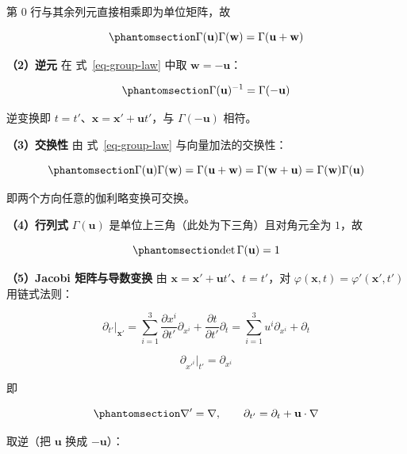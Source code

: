 \documentclass[
  chinese,
  a4paper,
  UTF8,
  12pt,
  oneside,
  openany]{ctexbook}
\theoremstyle{plain}
\theoremstyle{plain}
\theoremstyle{plain}
\theoremstyle{definition}
\theoremstyle{plain}
\theoremstyle{plain}
\theoremstyle{remark}
\begin{document}
第 \(0\) 行与其余列元直接相乘即为单位矩阵，故

\begin{equation}\protect\phantomsection\label{eq-group-law}{
\Gamma(\mathbf{u})\Gamma(\mathbf{w})=\Gamma(\mathbf{u}+\mathbf{w})
}\end{equation}

\textbf{（2）逆元} 在 式~\ref{eq-group-law} 中取
\(\mathbf{w}=-\mathbf{u}\)：

\begin{equation}\protect\phantomsection\label{eq-inverse}{
\Gamma(\mathbf{u})^{-1}=\Gamma(-\mathbf{u})
}\end{equation}

逆变换即 \(t=t'\)、\(\mathbf{x}=\mathbf{x}'+\mathbf{u}t'\)，与
\(\Gamma(-\mathbf{u})\) 相符。

\textbf{（3）交换性} 由 式~\ref{eq-group-law} 与向量加法的交换性：

\begin{equation}\protect\phantomsection\label{eq-boost-commute}{
\Gamma(\mathbf{u})\Gamma(\mathbf{w})=\Gamma(\mathbf{u}+\mathbf{w})=\Gamma(\mathbf{w}+\mathbf{u})=\Gamma(\mathbf{w})\Gamma(\mathbf{u})
}\end{equation}

即两个方向任意的伽利略变换可交换。

\textbf{（4）行列式} \(\Gamma(\mathbf{u})\)
是单位上三角（此处为下三角）且对角元全为 \(1\)，故

\begin{equation}\protect\phantomsection\label{eq-det}{
\det\Gamma(\mathbf{u})=1
}\end{equation}

\textbf{（5）Jacobi 矩阵与导数变换} 由
\(\mathbf{x}=\mathbf{x}'+\mathbf{u}t'\)、\(t=t'\)，对
\(\varphi(\mathbf{x},t)=\varphi'(\mathbf{x}',t')\) 用链式法则：

\[
\partial_{t'}\Big|_{\mathbf{x}'}
=\sum_{i=1}^{3}\frac{\partial x^{i}}{\partial t'}\partial_{x^{i}}+\frac{\partial t}{\partial t'}\partial_{t}
=\sum_{i=1}^{3}u^{i}\partial_{x^{i}}+\partial_{t}
\]

\[
\partial_{x'^{i}}\Big|_{t'}=\partial_{x^{i}}
\]

即

\begin{equation}\protect\phantomsection\label{eq-derivative-transform}{
\nabla'=\nabla,\qquad \partial_{t'}=\partial_{t}+\mathbf{u}\cdot\nabla
}\end{equation}

取逆（把 \(\mathbf{u}\) 换成 \(-\mathbf{u}\)）：
\end{document}

